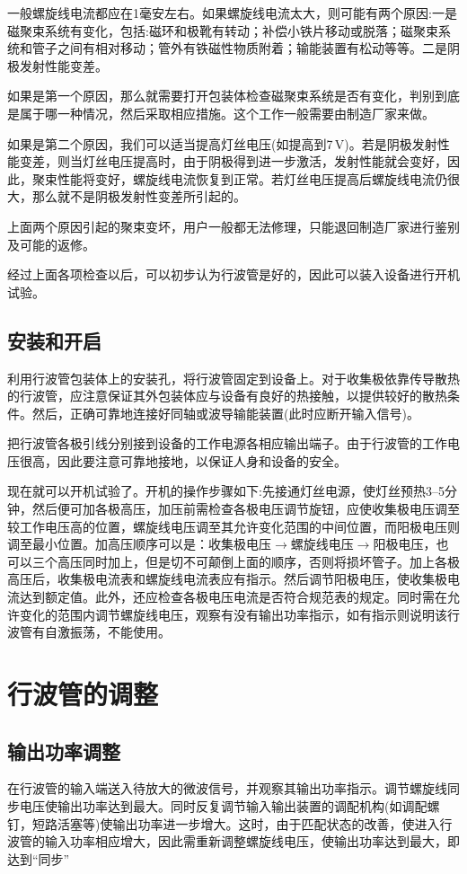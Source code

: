 一般螺旋线电流都应在1毫安左右。如果螺旋线电流太大，则可能有两个原因:一是磁聚束系统有变化，包括:磁环和极靴有转动；补偿小铁片移动或脱落；磁聚束系统和管子之间有相对移动；管外有铁磁性物质附着；输能装置有松动等等。二是阴极发射性能变差。

如果是第一个原因，那么就需要打开包装体检查磁聚束系统是否有变化，判别到底是属于哪一种情况，然后采取相应措施。这个工作一般需要由制造厂家来做。

如果是第二个原因，我们可以适当提高灯丝电压(如提高到7\,V)。若是阴极发射性能变差，则当灯丝电压提高时，由于阴极得到进一步激活，发射性能就会变好，因此，聚束性能将变好，螺旋线电流恢复到正常。若灯丝电压提高后螺旋线电流仍很大，那么就不是阴极发射性变差所引起的。

上面两个原因引起的聚束变坏，用户一般都无法修理，只能退回制造厂家进行鉴别及可能的返修。

经过上面各项检查以后，可以初步认为行波管是好的，因此可以装入设备进行开机试验。
\subsection{安装和开启}
利用行波管包装体上的安装孔，将行波管固定到设备上。对于收集极依靠传导散热的行波管，应注意保证其外包装体应与设备有良好的热接触，以提供较好的散热条件。然后，正确可靠地连接好同轴或波导输能装置(此时应断开输入信号)。

把行波管各极引线分别接到设备的工作电源各相应输出端子。由于行波管的工作电压很高，因此要注意可靠地接地，以保证人身和设备的安全。


现在就可以开机试验了。开机的操作步骤如下:先接通灯丝电源，使灯丝预热3--5分钟，然后便可加各极高压，加压前需检查各极电压调节旋钮，应使收集极电压调至较工作电压高的位置，螺旋线电压调至其允许变化范围的中间位置，而阳极电压则调至最小位置。加高压顺序可以是：收集极电压$ \to $螺旋线电压$ \to $阳极电压，也可以三个高压同时加上，但是切不可颠倒上面的顺序，否则将损坏管子。加上各极高压后，收集极电流表和螺旋线电流表应有指示。然后调节阳极电压，使收集极电流达到额定值。此外，还应检查各极电压电流是否符合规范表的规定。同时需在允许变化的范围内调节螺旋线电压，观察有没有输出功率指示，如有指示则说明该行波管有自激振荡，不能使用。

\section{行波管的调整}
\subsection{输出功率调整}
在行波管的输入端送入待放大的微波信号，并观察其输出功率指示。调节螺旋线同步电压使输出功率达到最大。同时反复调节输入输出装置的调配机构(如调配螺钉，短路活塞等)使输出功率进一步增大。这时，由于匹配状态的改善，使进入行波管的输入功率相应增大，因此需重新调整螺旋线电压，使输出功率达到最大，即达到“同步”


